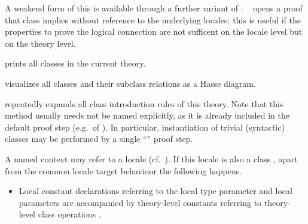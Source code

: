 \begin{isabellebody}
\begin{isamarkuptext}
\begin{description}
  A weakend form of this is available through a further variant of
  \hyperlink{command.instance}{\mbox{}}:  \hyperlink{command.instance}{\mbox{}}~ opens
  a proof that class  implies  without reference
  to the underlying locales;  this is useful if the properties to prove
  the logical connection are not sufficent on the locale level but on
  the theory level.

  \item \hyperlink{command.print-classes}{\mbox{}} prints all classes in the current
  theory.

  \item \hyperlink{command.class-deps}{\mbox{}} visualizes all classes and their
  subclass relations as a Hasse diagram.

  \item \hyperlink{method.intro-classes}{\mbox{}} repeatedly expands all class
  introduction rules of this theory.  Note that this method usually
  needs not be named explicitly, as it is already included in the
  default proof step (e.g.\ of \hyperlink{command.proof}{\mbox{}}).  In particular,
  instantiation of trivial (syntactic) classes may be performed by a
  single ``\hyperlink{command.ddot}{\mbox{\isa{\isacommand{{\isachardot}{\isachardot}}}}}'' proof step.

  \end{description}%
\end{isamarkuptext}%
\isamarkuptrue%
%
\isamarkuptrue%
%
\begin{isamarkuptext}%

  A named context may refer to a locale (cf.\ ).
  If this locale is also a class , apart from the common
  locale target behaviour the following happens.

  \begin{itemize}

  \item Local constant declarations  referring to the
  local type parameter \isa{{\isasymalpha}} and local parameters 
  are accompanied by theory-level constants 
  referring to theory-level class operations .


\end{itemize}
\end{isamarkuptext}
\end{isabellebody}
